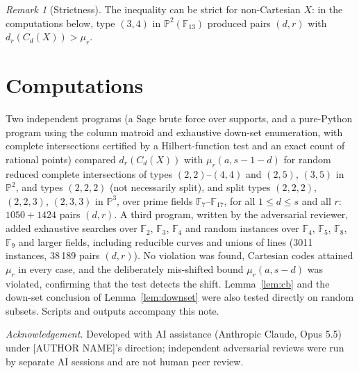 \documentclass[11pt]{amsart}
\theoremstyle{remark}
\newtheorem{remark}[theorem]{Remark}
\theoremstyle{definition}
\newcommand{\F}{\mathbb F}
\begin{document}
\begin{remark}[Strictness]
The inequality can be strict for non-Cartesian $X$: in the computations below, type $(3,4)$ in
$\mathbb P^2(\F_{13})$ produced pairs $(d,r)$ with $d_r(C_d(X))>\mu_r$.
\end{remark}

\section{Computations}
Two independent programs (a Sage brute force over supports, and a pure-Python program using the
column matroid and exhaustive down-set enumeration, with complete intersections certified by a
Hilbert-function test and an exact count of rational points) compared $d_r(C_d(X))$ with
$\mu_r(a,s-1-d)$ for random reduced complete intersections of types $(2,2)$--$(4,4)$ and $(2,5)$, $(3,5)$
in $\mathbb P^2$, and types $(2,2,2)$ (not necessarily split), and split types $(2,2,2)$, $(2,2,3)$, $(2,3,3)$ in
$\mathbb P^3$, over prime fields $\F_7$--$\F_{17}$, for all $1\le d\le s$ and all $r$: $1050+1424$ pairs
$(d,r)$. A third program, written by the adversarial reviewer, added exhaustive searches over $\F_2$,
$\F_3$, $\F_4$ and random instances over $\F_4$, $\F_5$, $\F_8$, $\F_9$ and larger fields, including reducible
curves and unions of lines (3011 instances, 38\,189 pairs $(d,r)$). No violation was found, Cartesian codes attained
$\mu_r$ in every case, and the deliberately mis-shifted bound $\mu_r(a,s-d)$ was violated, confirming that
the test detects the shift. Lemma~\ref{lem:cb} and the down-set conclusion of Lemma~\ref{lem:downset}
were also tested directly on random subsets. Scripts and outputs accompany this note.

\medskip\noindent\emph{Acknowledgement.} Developed with AI assistance (Anthropic Claude, Opus 5.5) under
[AUTHOR NAME]'s direction; independent adversarial reviews were run by separate AI sessions and are not
human peer review.
\end{document}
